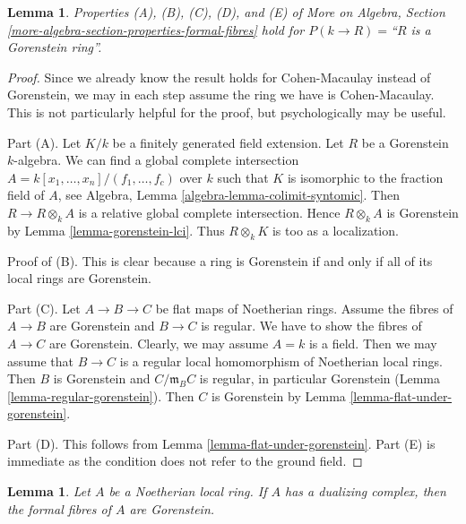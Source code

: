\documentclass{stacks-project}
\theoremstyle{plain}
\newtheorem{lemma}[subsection]{Lemma}
\theoremstyle{definition}
\theoremstyle{remark}
\numberwithin{equation}{subsection}
\begin{document}
\begin{lemma}
\label{lemma-formal-fibres-gorenstein}
Properties (A), (B), (C), (D), and (E) of
More on Algebra, Section \ref{more-algebra-section-properties-formal-fibres}
hold for $P(k \to R) =$``$R$ is a Gorenstein ring''.
\end{lemma}

\begin{proof}
Since we already know the result holds for Cohen-Macaulay instead
of Gorenstein, we may in each step assume the ring we have is
Cohen-Macaulay. This is not particularly helpful for the proof, but
psychologically may be useful.

\medskip\noindent
Part (A). Let $K/k$ be a finitely generated field extension.
Let $R$ be a Gorenstein $k$-algebra.
We can find a global complete intersection
$A = k[x_1, \ldots, x_n]/(f_1, \ldots, f_c)$
over $k$ such that $K$ is isomorphic to the fraction field of $A$, see
Algebra, Lemma \ref{algebra-lemma-colimit-syntomic}.
Then $R \to R \otimes_k A$ is a relative global complete intersection.
Hence $R \otimes_k A$ is Gorenstein by Lemma \ref{lemma-gorenstein-lci}.
Thus $R \otimes_k K$ is too as a localization.

\medskip\noindent
Proof of (B). This is clear because a ring is Gorenstein
if and only if all of its local rings are Gorenstein.

\medskip\noindent
Part (C). Let $A \to B \to C$ be flat maps of Noetherian rings.
Assume the fibres of $A \to B$ are Gorenstein and $B \to C$ is regular.
We have to show the fibres of $A \to C$ are Gorenstein.
Clearly, we may assume $A = k$ is a field. Then we may assume that
$B \to C$ is a regular local homomorphism of Noetherian local rings.
Then $B$ is Gorenstein and $C/\mathfrak m_B C$ is regular, in
particular Gorenstein (Lemma \ref{lemma-regular-gorenstein}).
Then $C$ is Gorenstein by
Lemma \ref{lemma-flat-under-gorenstein}.

\medskip\noindent
Part (D). This follows from Lemma \ref{lemma-flat-under-gorenstein}.
Part (E) is immediate as the condition does not refer to the ground field.
\end{proof}

\begin{lemma}
\label{lemma-dualizing-gorenstein-formal-fibres}
Let $A$ be a Noetherian local ring. If $A$ has a dualizing complex,
then the formal fibres of $A$ are Gorenstein.
\end{lemma}
\end{document}
